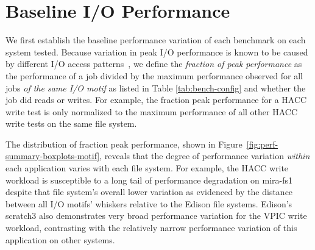 \section{Baseline I/O Performance} \label{sec:results}


We first establish the baseline performance variation of each benchmark on each system tested.
Because variation in peak I/O performance is known to be caused by different I/O access patterns~\cite{Lofstead2010,Uselton2010,Xie2012}, 
we define the \emph{fraction of peak performance} as the performance of a job divided by the maximum performance observed for all jobs \emph{of the same I/O motif} as listed in Table \ref{tab:bench-config} and whether the job did reads or writes.
For example, the fraction peak performance for a HACC write test is only normalized to the maximum performance of all other HACC write tests on the same file system.

The distribution of fraction peak performance, shown in Figure~\ref{fig:perf-summary-boxplots-motif}, reveals that the degree of performance variation \emph{within} each application varies with each file system.
For example, the HACC write workload is susceptible to a long tail of performance degradation on mira-fs1 despite that file system's overall lower variation as evidenced by the distance between all I/O motifs' whiskers relative to the Edison file systems.
Edison's scratch3 also demonstrates very broad performance variation for the VPIC write workload, contrasting with the relatively narrow performance variation of this application on other systems.

